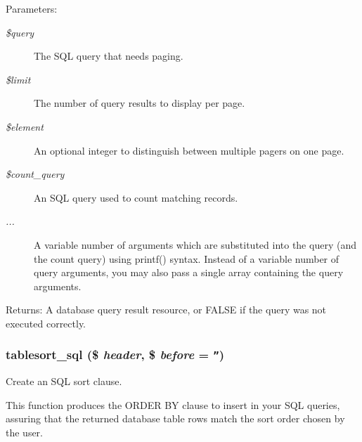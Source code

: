 \begin{Desc}
\item[Parameters:]
\begin{description}
\item[{\em \$query}]The SQL query that needs paging. \item[{\em \$limit}]The number of query results to display per page. \item[{\em \$element}]An optional integer to distinguish between multiple pagers on one page. \item[{\em \$count\_\-query}]An SQL query used to count matching records. \item[{\em ...}]A variable number of arguments which are substituted into the query (and the count query) using printf() syntax. Instead of a variable number of query arguments, you may also pass a single array containing the query arguments. \end{description}
\end{Desc}
\begin{Desc}
\item[Returns:]A database query result resource, or FALSE if the query was not executed correctly. \end{Desc}
\hypertarget{group__database_gd893ca6e60341e448203269c520696ce}{
\subsubsection[{tablesort\_\-sql}]{\setlength{\rightskip}{0pt plus 5cm}tablesort\_\-sql (\$ {\em header}, \/  \$ {\em before} = {\tt ''})}}
\label{group__database_gd893ca6e60341e448203269c520696ce}


Create an SQL sort clause.

This function produces the ORDER BY clause to insert in your SQL queries, assuring that the returned database table rows match the sort order chosen by the user.

